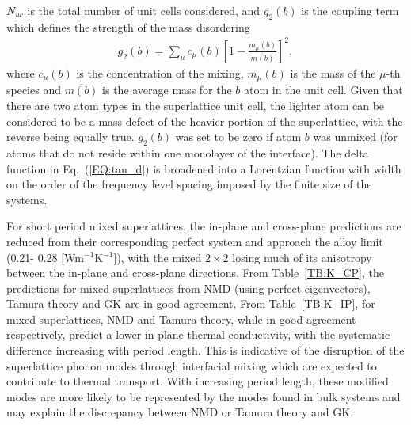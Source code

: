 \documentclass[aps,prb,preprint,preprintnumbers,amsmath,amssymb,floatfix,superscriptaddress]{revtex4}
\begin{document}
$N_{uc}$ is the total number of unit cells considered, and $g_2(b)$ is the coupling term which defines the strength of the mass disordering
\begin{equation}\label{EQ:g(b)}
\begin{split}
g_2(b) = \sum_\mu c_{\mu}(b)\left[1-\frac{m_{\mu}(b)}{\overline{m(b)}}\right]^2, 
\end{split}
\end{equation}
where $c_\mu(b)$ is the concentration of the mixing, $m_\mu(b)$ is the mass of the $\mu$-th species and $\overline{m(b)}$ is the average mass for the $b$ atom in the unit cell. Given that there are two atom types in the superlattice unit cell, the lighter atom can be considered to be a mass defect of the heavier portion of the superlattice, with the reverse being equally true. $g_2(b)$ was set to be zero if atom $b$ was unmixed (for atoms that do not reside within one monolayer of the interface). The delta function in Eq.~(\ref{EQ:tau_d}) is broadened into a Lorentzian function with width on the order of the frequency level spacing imposed by the finite size of the systems.\cite{allen_thermal_1993}

For short period mixed superlattices, the in-plane and cross-plane predictions are reduced from their corresponding perfect system and approach the alloy limit (0.21- 0.28 [Wm$^{-1}$K$^{-1}$]), with the mixed $2\times 2$ losing much of its anisotropy between the in-plane and cross-plane directions. From Table~\ref{TB:K_CP}, the predictions for mixed superlattices from NMD (using perfect eigenvectors), Tamura theory and GK are in good agreement. From Table~\ref{TB:K_IP}, for mixed superlattices, NMD and Tamura theory, while in good agreement respectively,  predict a lower in-plane thermal conductivity, with the systematic difference increasing with period length. This is indicative of the disruption of the superlattice phonon modes through interfacial mixing which are expected to contribute to thermal transport. With increasing period length, these modified modes are more likely to be represented by the modes found in bulk systems and may explain the discrepancy between NMD or Tamura theory and GK.
\end{document}
